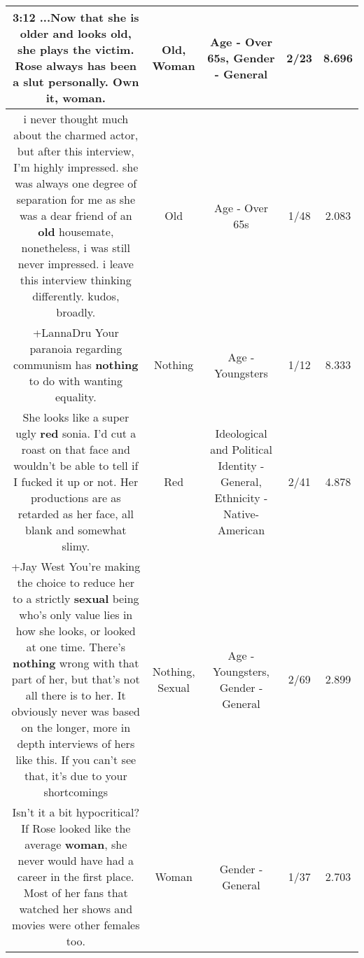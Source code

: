 \documentclass[11pt]{article}
\newlength\mylength
\begin{document}
\begin{center}
\begin{longtable}{|C{.65\mylength}|C{.30\mylength}|C{.12\mylength}|C{.12\mylength}|C{.12\mylength}|}
  \small 3:12 ...Now that she is older and looks \textbf{old}, she plays the victim. Rose always has been a slut personally. Own it, \textbf{woman}.\normalsize   & Old, Woman & Age - Over 65s, Gender - General & 2/23 & 8.696 \\  \hline
  \small i never thought much about the charmed actor, but after this interview, I'm highly impressed. she was always one degree of separation for me as she was a dear friend of an \textbf{old} housemate, nonetheless, i was still never impressed. i leave this interview thinking differently. kudos, broadly.\normalsize   & Old & Age - Over 65s & 1/48 & 2.083 \\  \hline
  \small +LannaDru Your paranoia regarding communism has \textbf{nothing} to do with wanting equality.\normalsize   & Nothing & Age - Youngsters & 1/12 & 8.333 \\  \hline
  \small She looks like a super ugly \textbf{r\textbf{ed}} sonia. I'd cut a roast on that face and wouldn't be able to tell if I fucked it up or not. Her productions are as retarded as her face, all blank and somewhat slimy.\normalsize   & Red &  Ideological and Political Identity - General, Ethnicity - Native-American & 2/41 & 4.878 \\  \hline
  \small +Jay West You're making the choice to reduce her to a strictly \textbf{sexual} being who's only value lies in how she looks, or looked at one time. There's \textbf{nothing} wrong with that part of her, but that's not all there is to her. It obviously never was based on the longer, more in depth interviews of hers like this. If you can't see that, it's due to your shortcomings\normalsize   & Nothing, Sexual & Age - Youngsters, Gender - General & 2/69 & 2.899 \\  \hline
  \small Isn't it a bit hypocritical? If Rose looked like the average \textbf{woman}, she never would have had a career in the first place. Most of her fans that watched her shows and movies were other females too.\normalsize   & Woman & Gender - General & 1/37 & 2.703 \\  \hline

\end{longtable}
\end{center}
\end{document}
